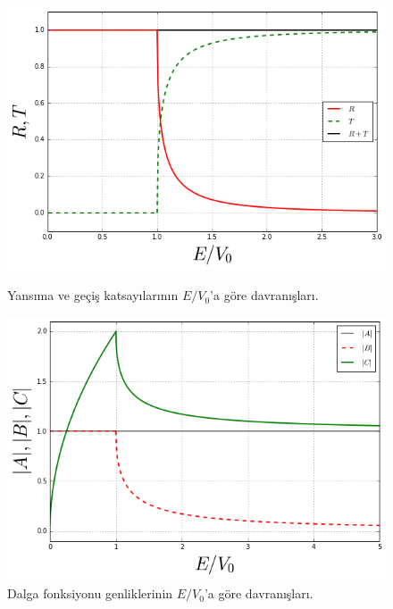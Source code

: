 \documentclass[a4paper,12pt, twoside]{article}
\begin{document}
\begin{figure}[!hbtp]
	\begin{minipage}{.5\textwidth}
		\centering
		\includegraphics[width=1.0\linewidth]{Basamak_Potansiyeli_TR_EV0_grafigi.png}
		\caption{Yansıma ve geçiş katsayılarının $E/V_0$'a göre davranışları.}
		\label{fig:basamakpotansiyelitrev0grafigi}
	\end{minipage}
	\begin{minipage}{.5\textwidth}
		\centering
		\includegraphics[width=1.0\linewidth]{Basamak_Potansiyeli_ABC_EV0_grafigi.png}
		\caption{Dalga fonksiyonu genliklerinin $E/V_0$'a göre davranışları.}
		\label{fig:basamakpotansiyeliABCev0grafigi}
	\end{minipage}
\end{figure}
\end{document}
